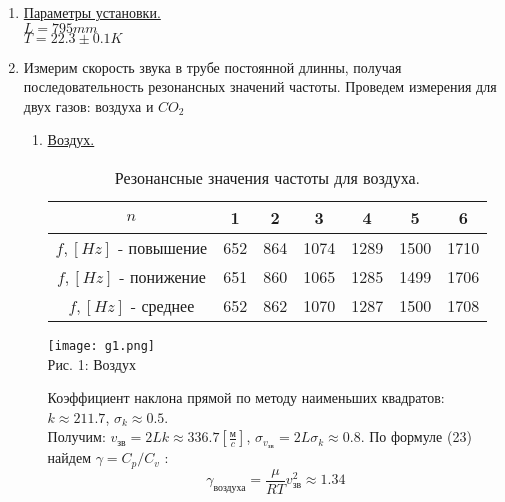 \documentclass[10pt]{article}
\begin{document}
    \begin{enumerate}
    \item \underline{Параметры установки.} \\
        $L = 795mm$ \\
        $T = 22.3\pm0.1K$
    \item 
        Измерим скорость звука в трубе постоянной длинны, получая последовательность резонансных значений частоты.
        Проведем измерения для двух газов: воздуха и $CO_2$
        \begin{enumerate}
        \item \underline{Воздух.} 
            \begin{table}[h]
                    \caption{Резонансные значения частоты для воздуха.}
                    \begin{center}
                    \begin{tabular}{|c|c|c|c|c|c|c|}
                            \hline 
                                $n$ & 1 & 2 & 3 & 4 & 5 & 6 \\
                            \hline
                                $f , [Hz]$ - повышение &652&864&1074&1289&1500&1710\\
                            \hline
                                $f , [Hz]$ - понижение &651&860&1065&1285&1499&1706\\
                            \hline
                                $f , [Hz]$ - среднее &652&862&1070&1287&1500&1708 \\
                            \hline
                            \end{tabular}
                        \end{center}
            \end{table}
            \begin{center} 
                \texttt{[image: g1.png]} 
                \\ Рис. 1: Воздух
            \end{center}

            Коэффициент наклона прямой по методу наименьших квадратов:  
                \indent $k \approx 211.7$, \quad $\sigma_k \approx 0.5$. \\
            Получим: 
                \indent $v_\text{зв} = 2L k \approx 336.7 \left[\frac{\text{м}}{c}\right]$, \quad 
             $\sigma_{v_\text{зв}} = 2L \sigma_k \approx 0.8$.
            По формуле (23) найдем $\gamma = C_p/C_v$ :
            \begin{equation}
                \gamma_{\text{воздуха}} = \frac{\mu}{RT}v_\text{зв}^2 \approx 1.34  
            \end{equation}
            

\end{enumerate}
\end{enumerate}
\end{document}
